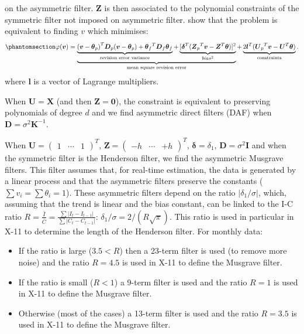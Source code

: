 \documentclass[
]{article}
\newcommand\transp[1]{{#1}^T}
\newcommand\1{\mathds{1}}
\begin{document}
on the asymmetric filter. \(\boldsymbol Z\) is then associated to the
polynomial constraints of the symmetric filter not imposed on asymmetric
filter. \textcite{proietti2008} show that the problem is equivalent to
finding \(v\) which minimises:
\begin{equation}\phantomsection\label{eq-lppasym}{
\varphi(\boldsymbol v)=
\underbrace{
  \underbrace{\transp{(\boldsymbol v-\boldsymbol \theta_{p})}\boldsymbol D_{p}(\boldsymbol v-\boldsymbol \theta_{p})+
  \transp{\boldsymbol \theta_{f}}\boldsymbol D_{f}\boldsymbol \theta_{f}}_\text{revision error variance}+
  \underbrace{[\transp{\boldsymbol \delta}(\transp{\boldsymbol Z_{p}}\boldsymbol v-\transp{\boldsymbol Z}\boldsymbol \theta)]^{2}}_{bias^2}
}_\text{mean square revision error}+
\underbrace{2\transp{\boldsymbol l}(\transp{\boldsymbol U_{p}}\boldsymbol v-\transp{\boldsymbol U}\boldsymbol \theta)}_{\text{constraints}}.
}\end{equation} where \(\boldsymbol l\) is a vector of Lagrange
multipliers.

When \(\boldsymbol U=\boldsymbol X\) (and then
\(\boldsymbol Z = \boldsymbol 0\)), the constraint is equivalent to
preserving polynomials of degree \(d\) and we find asymmetric direct
filters (DAF) when \(\boldsymbol D=\sigma^2\boldsymbol K^{-1}\).

When \(\boldsymbol U=\transp{\begin{pmatrix}1&\cdots&1\end{pmatrix}}\),
\(\boldsymbol Z=\transp{\begin{pmatrix}-h&\cdots&+h\end{pmatrix}}\),
\(\boldsymbol \delta=\delta_1\), \(\boldsymbol D=\sigma^2\boldsymbol I\)
and when the symmetric filter is the Henderson filter, we find the
asymmetric Musgrave filters. This filter assumes that, for real-time
estimation, the data is generated by a linear process and that the
asymmetric filters preserve the constants
(\(\sum v_i=\sum \theta_i=1\)). These asymmetric filters depend on the
ratio \(\lvert\delta_1/\sigma\rvert\), which, assuming that the trend is
linear and the bias constant, can be linked to the I-C ratio
\(R=\frac{\bar{I}}{\bar{C}}=\frac{\sum\lvert I_t-I_{t-1}\rvert}{\sum\lvert C_t-C_{t-1}\rvert}\):
\(\delta_1/\sigma=2/(R\sqrt{\pi})\). This ratio is used in particular in
X-11 to determine the length of the Henderson filter. For monthly data:

\begin{itemize}
\item
  If the ratio is large (\(3.5< R\)) then a 23-term filter is used (to
  remove more noise) and the ratio \(R=4.5\) is used in X-11 to define
  the Musgrave filter.
\item
  If the ratio is small (\(R<1\)) a 9-term filter is used and the ratio
  \(R=1\) is used in X-11 to define the Musgrave filter.
\item
  Otherwise (most of the cases) a 13-term filter is used and the ratio
  \(R=3.5\) is used in X-11 to define the Musgrave filter.
\end{itemize}
\end{document}
